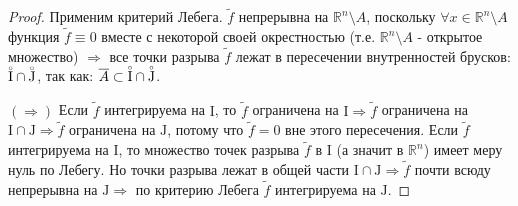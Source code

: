 \documentclass[12pt]{article}
\newcommand{\MR}{\mathbb{R}}
\newcommand{\MI}{\mathrm{I}}
\newcommand{\MJ}{\mathrm{J}}
\theoremstyle{definition}
\newcommand{\wte}[1]{\widetilde{#1}}
\newcommand{\ovl}[1]{\overline{#1}}
\newcommand{\Circ}[1]{\accentset{\circ}{#1}}
\begin{document}
\begin{proof}
	Применим критерий Лебега. $\wte{f}$ непрерывна на $\MR^n \setminus A$, поскольку $\forall x \in \MR^n \setminus A$ функция $\wte{f} \equiv 0$ вместе с некоторой своей окрестностью (т.е. $\MR^n \setminus A$ - открытое множество) $\Rightarrow$ все точки разрыва $\wte{f}$ лежат в пересечении внутренностей брусков: $\Circ{\MI}\cap \Circ{\MJ}$, так как: $\ovl{A} \subset \Circ{\MI}\cap \Circ{\MJ}$. 
	
	$(\Rightarrow)$ Если $\wte{f}$ интегрируема на $\MI$, то $\wte{f}$ ограничена на $\MI \Rightarrow \wte{f}$ ограничена на $\MI \cap \MJ \Rightarrow \wte{f}$ ограничена на $\MJ$, потому что $\wte{f} = 0$ вне этого пересечения. Если $\wte{f}$ интегрируема на $\MI$, то множество точек разрыва $\wte{f}$ в $\MI$ (а значит в $\MR^n$) имеет меру нуль по Лебегу. Но точки разрыва лежат в общей части $\MI \cap \MJ \Rightarrow \wte{f}$ почти всюду непрерывна на $\MJ \Rightarrow$ по критерию Лебега $\wte{f}$ интегрируема на $\MJ$.
	

\end{proof}
\end{document}
